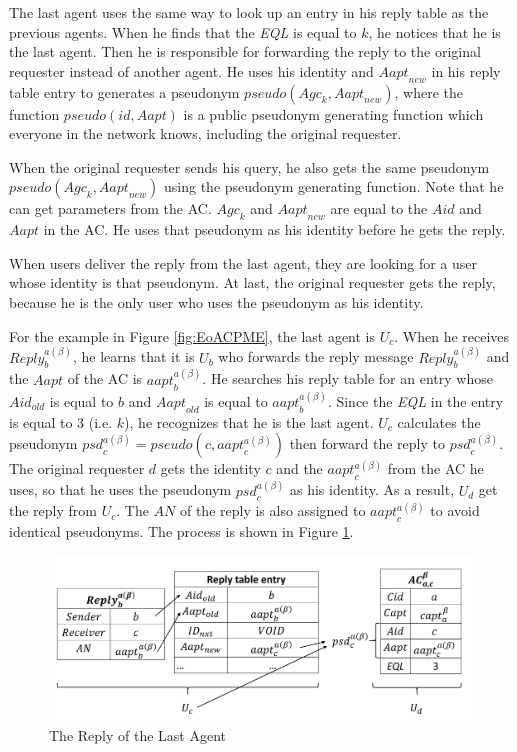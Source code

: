 The last agent uses the same way to look up an entry in his reply table as the previous agents. When he finds that the \textit{EQL} is equal to $k$, he notices that he is the last agent. Then he is responsible for forwarding the reply to the original requester instead of another agent. He uses his identity and ${Aapt}_{new}$ in his reply table entry to generates a pseudonym $pseudo\left({Agc}_k,{Aapt}_{new}\right)$, where the function $pseudo\left(id,Aapt\right)$ is a public pseudonym generating function which everyone in the network knows, including the original requester.

When the original requester sends his query, he also gets the same pseudonym $pseudo\left({Agc}_k,{Aapt}_{new}\right)$ using the pseudonym generating function. Note that he can get parameters from the AC. ${Agc}_k$ and ${Aapt}_{new}$ are equal to the $Aid$ and $Aapt$ in the AC. He uses that pseudonym as his identity before he gets the reply.

When users deliver the reply from the last agent, they are looking for a user whose identity is that pseudonym. At last, the original requester gets the reply, because he is the only user who uses the pseudonym as his identity.

For the example in Figure \ref{fig:EoACPME}, the last agent is $U_c$. When he receives ${Reply}^{a\left(\beta\right)}_b$, he learns that it is $U_b$ who forwards the reply message ${Reply}^{a\left(\beta\right)}_b$ and the $Aapt$ of the AC is ${aapt}^{a\left(\beta\right)}_b$. He searches his reply table for an entry whose ${Aid}_{old}$ is equal to $b$ and ${Aapt}_{old}$ is equal to ${aapt}^{a\left(\beta\right)}_b$. Since the \textit{EQL} in the entry is equal to 3 (i.e. $k$), he recognizes that he is the last agent. $U_c$ calculates the pseudonym ${psd}^{a\left(\beta \right)}_c=pseudo\left(c,{aapt}^{a\left(\beta\right)}_c\right)$ then forward the reply to ${psd}^{a\left(\beta\right)}_c$. The original requester $d$ gets the identity $c$ and the ${aapt}^{a\left(\beta \right)}_c$ from the AC he uses, so that he uses the pseudonym ${psd}^{a\left(\beta \right)}_c$ as his identity. As a result, $U_d$ get the reply from $U_c$. The $AN$ of the reply is also assigned to ${aapt}^{a\left(\beta\right)}_c$ to avoid identical pseudonyms. The process is shown in Figure \ref{fig:ReplyOfLastAgent}. 

\begin{figure} [hbtp]
  \centering 
  \includegraphics[width=6.0in]{figures/FIG_4_9_The_Reply_of_the_Last_Agent.png}
  \caption{The Reply of the Last Agent} 
  \label{fig:ReplyOfLastAgent} %
\end{figure}

